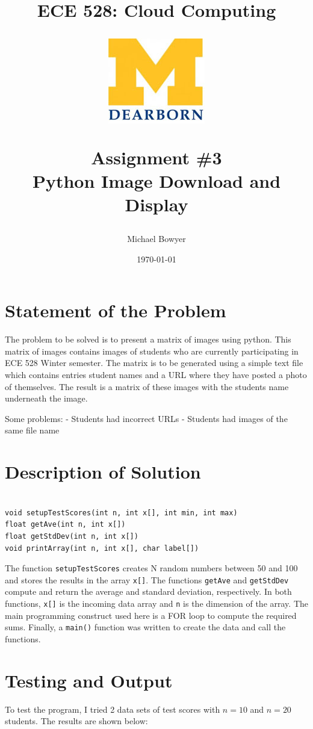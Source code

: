 \documentclass[12pt, letterpaper, final, onecolumn, titlepage] {article}
\title{ECE 528: Cloud Computing \\
	\vspace{1.5cm}
   		\begin{center}\includegraphics{umlogo} \end{center}
	\vspace{1.5cm}
	\textbf{Assignment \#3} \\
Python Image Download and Display}
\author{Michael Bowyer}
\date{\today}
\begin{document}
\maketitle

\doublespacing

\section{Statement of the Problem}

The problem to be solved is to present a matrix of images using python. This matrix of images contains images of students who are currently participating in ECE 528 Winter semester. The matrix is to be generated using a simple text file which contains entries student names and a URL where they have posted a photo of themselves. The result is a matrix of these images with the students name underneath the image.

Some problems:
- Students had incorrect URLs
- Students had images of the same file name

\section{Description of Solution}

\singlespacing
\begin{lstlisting}

void setupTestScores(int n, int x[], int min, int max)
float getAve(int n, int x[])
float getStdDev(int n, int x[])
void printArray(int n, int x[], char label[])

\end{lstlisting}
\doublespacing

The function \texttt{setupTestScores} creates N random numbers between 50 and 100 and stores the results in the array \texttt{x[]}. The functions \texttt{getAve} and \texttt{getStdDev} compute and return the average and standard deviation, respectively. In both functions, \texttt{x[]} is the incoming data array and \texttt{n} is the dimension of the array. The main programming construct used here is a FOR loop to compute the required sums. Finally, a \texttt{main()} function was written to create the data and call the functions.

\section{Testing and Output}

To test the program, I tried 2 data sets of test scores with \(n = 10\) and \(n = 20\) students. The results are shown below:
\end{document}
